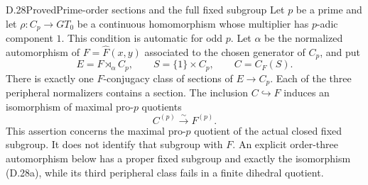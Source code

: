 \begin{claim}{D.28}{Proved}{Prime-order sections and the full fixed subgroup}
Let $p$ be a prime and let $\rho:C_p\to GT_0$ be a continuous
homomorphism whose multiplier has $p$-adic component $1$.
This condition is automatic for odd $p$. Let $\alpha$ be the
normalized automorphism of $F=\widehat F(x,y)$ associated to
the chosen generator of $C_p$, and put
\[
 E=F\rtimes_\alpha C_p,\qquad S=\{1\}\times C_p,
 \qquad C=C_F(S).
\]
There is exactly one $F$-conjugacy class of sections of
$E\to C_p$. Each of the three peripheral normalizers contains
a section. The inclusion $C\hookrightarrow F$ induces an
isomorphism of maximal pro-$p$ quotients
\[
                         C^{(p)}\xrightarrow{\sim}F^{(p)}.
                                                               \tag{D.28a}
\]
This assertion concerns the maximal pro-$p$ quotient of the
actual closed fixed subgroup. It does not identify that
subgroup with $F$. An explicit order-three automorphism below
has a proper fixed subgroup and exactly the isomorphism
(D.28a), while its third peripheral class fails in a finite
dihedral quotient.
\end{claim}
